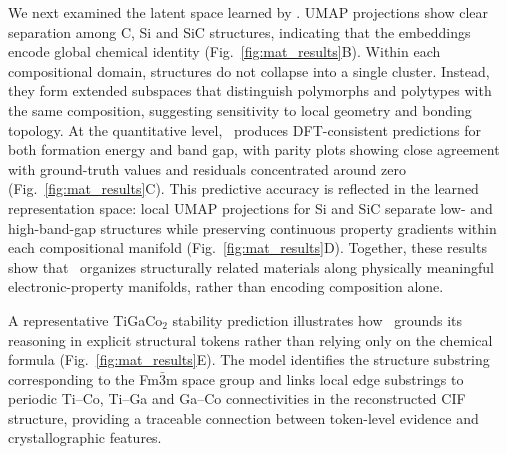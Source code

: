 We next examined the latent space learned by \projName. UMAP projections show clear separation among C, Si and SiC structures, indicating that the embeddings encode global chemical identity (Fig.~\ref{fig:mat_results}B). Within each compositional domain, structures do not collapse into a single cluster. Instead, they form extended subspaces that distinguish polymorphs and polytypes with the same composition, suggesting sensitivity to local geometry and bonding topology. 
At the quantitative level, \projName~produces DFT-consistent predictions for both formation energy and band gap, with parity plots showing close agreement with ground-truth values and residuals concentrated around zero (Fig.~\ref{fig:mat_results}C). This predictive accuracy is reflected in the learned representation space: local UMAP projections for Si and SiC separate low- and high-band-gap structures while preserving continuous property gradients within each compositional manifold (Fig.~\ref{fig:mat_results}D). Together, these results show that \projName~organizes structurally related materials along physically meaningful electronic-property manifolds, rather than encoding composition alone. 

A representative TiGaCo$_2$ stability prediction illustrates how \projName~grounds its reasoning in explicit structural tokens rather than relying only on the chemical formula (Fig.~\ref{fig:mat_results}E). The model identifies the structure substring corresponding to the Fm$\bar{3}$m space group and links local edge substrings to periodic Ti--Co, Ti--Ga and Ga--Co connectivities in the reconstructed CIF structure, providing a traceable connection between token-level evidence and crystallographic features.  

 



 

 
 
 


 
 
 
 
 

 

 

 

 
 
 
 
 
 
 

 
 
 

 
 
 
 
